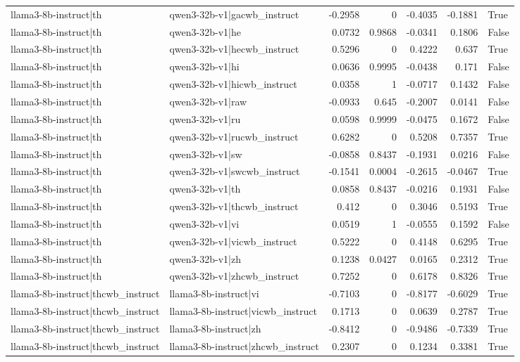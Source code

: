\begin{table}
\begin{tabular}{l l r r r r l}
llama3-8b-instruct|th & qwen3-32b-v1|gacwb_instruct & -0.2958 & 0 & -0.4035 & -0.1881 & True \\
llama3-8b-instruct|th & qwen3-32b-v1|he & 0.0732 & 0.9868 & -0.0341 & 0.1806 & False \\
llama3-8b-instruct|th & qwen3-32b-v1|hecwb_instruct & 0.5296 & 0 & 0.4222 & 0.637 & True \\
llama3-8b-instruct|th & qwen3-32b-v1|hi & 0.0636 & 0.9995 & -0.0438 & 0.171 & False \\
llama3-8b-instruct|th & qwen3-32b-v1|hicwb_instruct & 0.0358 & 1 & -0.0717 & 0.1432 & False \\
llama3-8b-instruct|th & qwen3-32b-v1|raw & -0.0933 & 0.645 & -0.2007 & 0.0141 & False \\
llama3-8b-instruct|th & qwen3-32b-v1|ru & 0.0598 & 0.9999 & -0.0475 & 0.1672 & False \\
llama3-8b-instruct|th & qwen3-32b-v1|rucwb_instruct & 0.6282 & 0 & 0.5208 & 0.7357 & True \\
llama3-8b-instruct|th & qwen3-32b-v1|sw & -0.0858 & 0.8437 & -0.1931 & 0.0216 & False \\
llama3-8b-instruct|th & qwen3-32b-v1|swcwb_instruct & -0.1541 & 0.0004 & -0.2615 & -0.0467 & True \\
llama3-8b-instruct|th & qwen3-32b-v1|th & 0.0858 & 0.8437 & -0.0216 & 0.1931 & False \\
llama3-8b-instruct|th & qwen3-32b-v1|thcwb_instruct & 0.412 & 0 & 0.3046 & 0.5193 & True \\
llama3-8b-instruct|th & qwen3-32b-v1|vi & 0.0519 & 1 & -0.0555 & 0.1592 & False \\
llama3-8b-instruct|th & qwen3-32b-v1|vicwb_instruct & 0.5222 & 0 & 0.4148 & 0.6295 & True \\
llama3-8b-instruct|th & qwen3-32b-v1|zh & 0.1238 & 0.0427 & 0.0165 & 0.2312 & True \\
llama3-8b-instruct|th & qwen3-32b-v1|zhcwb_instruct & 0.7252 & 0 & 0.6178 & 0.8326 & True \\
llama3-8b-instruct|thcwb_instruct & llama3-8b-instruct|vi & -0.7103 & 0 & -0.8177 & -0.6029 & True \\
llama3-8b-instruct|thcwb_instruct & llama3-8b-instruct|vicwb_instruct & 0.1713 & 0 & 0.0639 & 0.2787 & True \\
llama3-8b-instruct|thcwb_instruct & llama3-8b-instruct|zh & -0.8412 & 0 & -0.9486 & -0.7339 & True \\
llama3-8b-instruct|thcwb_instruct & llama3-8b-instruct|zhcwb_instruct & 0.2307 & 0 & 0.1234 & 0.3381 & True \\

\end{tabular}
\end{table}
